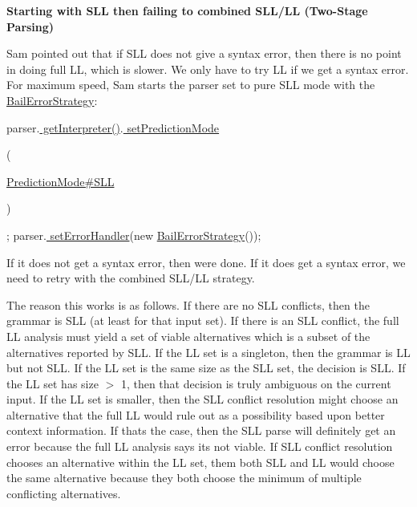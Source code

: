 {\bfseries Starting with S\+LL then failing to combined S\+L\+L/\+LL (Two-\/\+Stage Parsing)}

Sam pointed out that if S\+LL does not give a syntax error, then there is no point in doing full LL, which is slower. We only have to try LL if we get a syntax error. For maximum speed, Sam starts the parser set to pure S\+LL mode with the \hyperlink{}{Bail\+Error\+Strategy}\+:


\begin{DoxyPre}
parser.\hyperlink{classantlr4_1_1Recognizer_a926f7b518ef08afd27eb9ab1af2e2757}{ getInterpreter()}.\hyperlink{}{ setPredictionMode}
\begin{DoxyCode}
( 
\end{DoxyCode}
 \hyperlink{ad9285036b2a01af0109507c442ea0e25aae2ecfbd95d475ddf08876080d57e3d9}{PredictionMode#SLL}
\begin{DoxyCode}
) 
\end{DoxyCode}
 ;
parser.\hyperlink{}{ setErrorHandler}(new \hyperlink{}{BailErrorStrategy}());
\end{DoxyPre}


If it does not get a syntax error, then we\textquotesingle{}re done. If it does get a syntax error, we need to retry with the combined S\+L\+L/\+LL strategy.

The reason this works is as follows. If there are no S\+LL conflicts, then the grammar is S\+LL (at least for that input set). If there is an S\+LL conflict, the full LL analysis must yield a set of viable alternatives which is a subset of the alternatives reported by S\+LL. If the LL set is a singleton, then the grammar is LL but not S\+LL. If the LL set is the same size as the S\+LL set, the decision is S\+LL. If the LL set has size $>$ 1, then that decision is truly ambiguous on the current input. If the LL set is smaller, then the S\+LL conflict resolution might choose an alternative that the full LL would rule out as a possibility based upon better context information. If that\textquotesingle{}s the case, then the S\+LL parse will definitely get an error because the full LL analysis says it\textquotesingle{}s not viable. If S\+LL conflict resolution chooses an alternative within the LL set, them both S\+LL and LL would choose the same alternative because they both choose the minimum of multiple conflicting alternatives.


